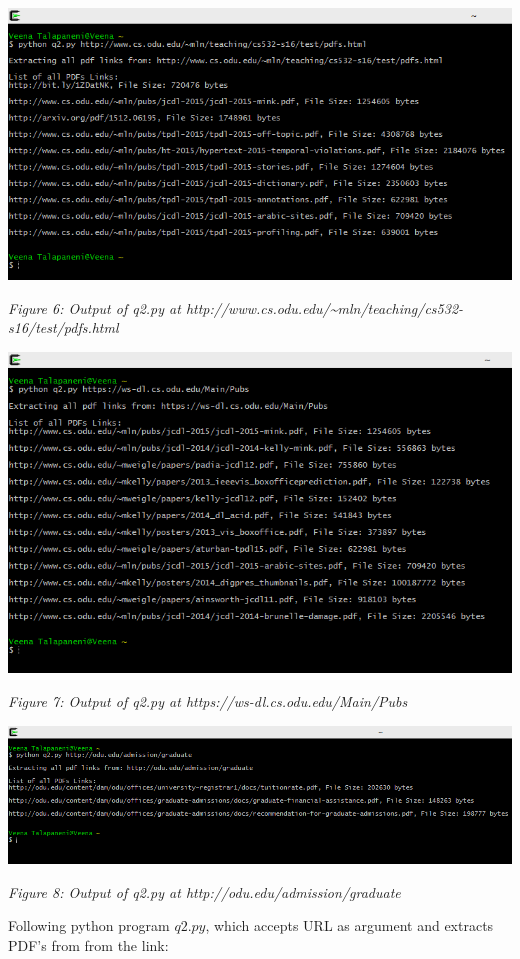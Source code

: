 \newpage
\vspace*{5pt}
\begin{center}
	\includegraphics[scale=0.85]{Q2/fig1.png}
	\centerline{\textit{Figure 6: Output of q2.py at http://www.cs.odu.edu/\~{}mln/teaching/cs532-s16/test/pdfs.html
}}
\end{center}
\vspace*{5pt}
\begin{center}
	\includegraphics[scale=0.85]{Q2/fig2.png}
	\centerline{\textit{Figure 7: Output of q2.py at https://ws-dl.cs.odu.edu/Main/Pubs}}
\end{center}
\vspace*{5mm}
\begin{center}
	\includegraphics[scale=0.70]{Q2/fig3.png}
	\centerline{\textit{Figure 8: Output of q2.py at http://odu.edu/admission/graduate}}
\end{center}
Following python program $q2.py$, which accepts URL as argument and extracts PDF's from from the link:
\vspace*{1mm}

